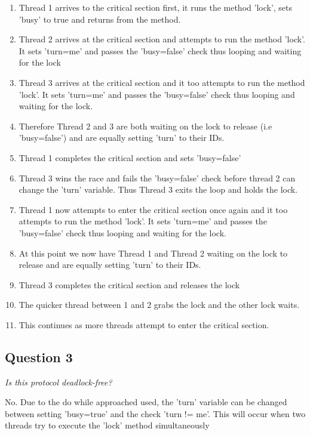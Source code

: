 \begin{enumerate}
\item Thread 1 arrives to the critical section first, it runs the method 'lock', 
sets 'busy' to true and returns from the method.
\item Thread 2 arrives at the critical section and attempts to run the method 
'lock'. It sets 'turn=me' and passes the 'busy=false' check thus looping and 
waiting for the lock
\item Thread 3 arrives at the critical section and it too attempts to run the 
method 'lock'. It sets 'turn=me' and passes the 'busy=false' check thus looping 
and waiting for the lock.
\item Therefore Thread 2 and 3 are both waiting on the lock to release 
(i.e 'busy=false') and are equally setting 'turn' to their IDs.
\item Thread 1 completes the critical section and sets 'busy=false'
\item Thread 3 wins the race and fails the 'busy=false' check before thread 2 
can change the 'turn' variable. Thus Thread 3 exits the loop and holds the lock.
\item Thread 1 now attempts to enter the critical section once again and it too 
attempts to run the method 'lock'. It sets 'turn=me' and passes the 'busy=false' 
check thus looping and waiting for the lock.
\item At this point we now have Thread 1 and Thread 2 waiting on the lock to 
release and are equally setting 'turn' to their IDs.
\item Thread 3 completes the critical section and releases the lock
\item The quicker thread between 1 and 2 grabs the lock and the other lock waits.
\item This continues as more threads attempt to enter the critical section.
\end{enumerate}

\subsection{Question 3}

\begin{center}
    \textit{Is this protocol deadlock-free?}
\end{center}

No. Due to the do while approached used, the 'turn' variable can be changed 
between setting 'busy=true' and the check 'turn != me'. This will occur when two 
threads try to execute the 'lock' method simultaneously

